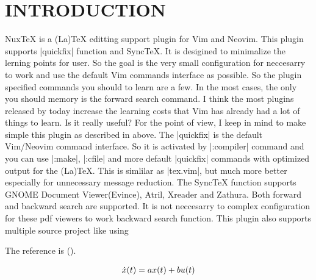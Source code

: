 
%

  


\section{INTRODUCTION}

NuxTeX is a (La)TeX editting support plugin for Vim and Neovim. This plugin supports |quickfix| function and SyncTeX. It is desigined to minimalize the lerning points for user. So the goal is the very small configuration for neccesarry to work and use the default Vim commands interface as possible.  So the plugin specified commands you should to learn are a few. In the most cases, the only you should memory is the forward search command.
I think the most plugins released by today increase the learning costs that Vim has already had a lot of things to learn. Is it really useful? For the point of view, I keep in mind to make simple this plugin as described in above. The |quickfix| is the default Vim/Neovim command interface. So it is activated by |:compiler| command and you can use |:make|, |:cfile| and more default |quickfix| commands with optimized output for the (La)TeX. This is simlilar as |tex.vim|, but much more better especially for unnecessary message reduction.
The SyncTeX function supports GNOME Document Viewer(Evince), Atril, Xreader and Zathura. Both forward and backward search are supported. It is not neccesarry to complex configuration for these pdf viewers to work backward search function.
This plugin also supports multiple source project like using \

The reference is (\cite{ref1}).


\begin{eqnarray}
{\normalsize \dot{x}(t) = a x(t) + b u(t)}
\end{eqnarray}

